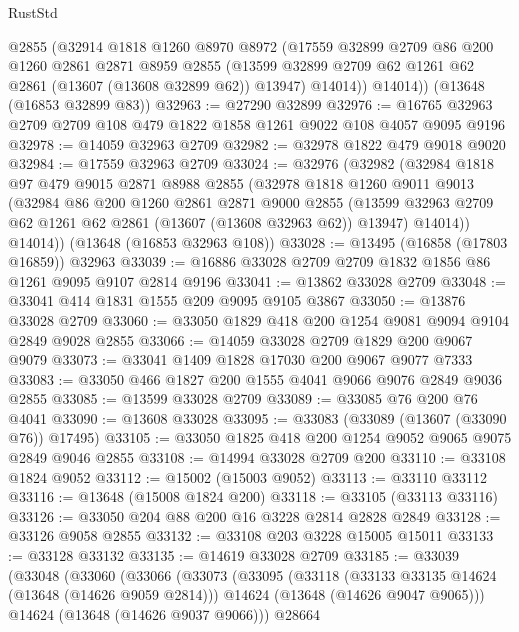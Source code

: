 \begin{lexlean}{RustStd}
\begin{coremodule}
        @2855
        (@32914
          @1818
          @1260
          @8970
          @8972
          (@17559
            @32899
            @2709
            @86
            @200
            @1260
            @2861
            @2871
            @8959
            @2855
            (@13599 @32899 @2709 @62 @1261 @62 @2861 (@13607 (@13608 @32899 @62)) @13947)
            @14014))
        @14014))
    (@13648 (@16853 @32899 @83))
@32963 := @27290 @32899
@32976 := @16765 @32963 @2709 @2709 @108 @479 @1822 @1858 @1261 @9022 @108 @4057 @9095 @9196
@32978 := @14059 @32963 @2709
@32982 := @32978 @1822 @479 @9018 @9020
@32984 := @17559 @32963 @2709
@33024 := @32976
    (@32982
      (@32984
        @1818
        @97
        @479
        @9015
        @2871
        @8988
        @2855
        (@32978
          @1818
          @1260
          @9011
          @9013
          (@32984
            @86
            @200
            @1260
            @2861
            @2871
            @9000
            @2855
            (@13599 @32963 @2709 @62 @1261 @62 @2861 (@13607 (@13608 @32963 @62)) @13947)
            @14014))
        @14014))
    (@13648 (@16853 @32963 @108))
@33028 := @13495 (@16858 (@17803 @16859)) @32963
@33039 := @16886 @33028 @2709 @2709 @1832 @1856 @86 @1261 @9095 @9107 @2814 @9196
@33041 := @13862 @33028 @2709
@33048 := @33041 @414 @1831 @1555 @209 @9095 @9105 @3867
@33050 := @13876 @33028 @2709
@33060 := @33050 @1829 @418 @200 @1254 @9081 @9094 @9104 @2849 @9028 @2855
@33066 := @14059 @33028 @2709 @1829 @200 @9067 @9079
@33073 := @33041 @1409 @1828 @17030 @200 @9067 @9077 @7333
@33083 := @33050 @466 @1827 @200 @1555 @4041 @9066 @9076 @2849 @9036 @2855
@33085 := @13599 @33028 @2709
@33089 := @33085 @76 @200 @76 @4041
@33090 := @13608 @33028
@33095 := @33083 (@33089 (@13607 (@33090 @76)) @17495)
@33105 := @33050 @1825 @418 @200 @1254 @9052 @9065 @9075 @2849 @9046 @2855
@33108 := @14994 @33028 @2709 @200
@33110 := @33108 @1824 @9052
@33112 := @15002 (@15003 @9052)
@33113 := @33110 @33112
@33116 := @13648 (@15008 @1824 @200)
@33118 := @33105 (@33113 @33116)
@33126 := @33050 @204 @88 @200 @16 @3228 @2814 @2828 @2849
@33128 := @33126 @9058 @2855
@33132 := @33108 @203 @3228 @15005 @15011
@33133 := @33128 @33132
@33135 := @14619 @33028 @2709
@33185 := @33039
    (@33048
      (@33060
        (@33066
          (@33073
            (@33095
              (@33118
                (@33133 @33135 @14624 (@13648 (@14626 @9059 @2814)))
                @14624
                (@13648 (@14626 @9047 @9065)))
              @14624
              (@13648 (@14626 @9037 @9066)))
            @28664

\end{coremodule}
\end{lexlean}
